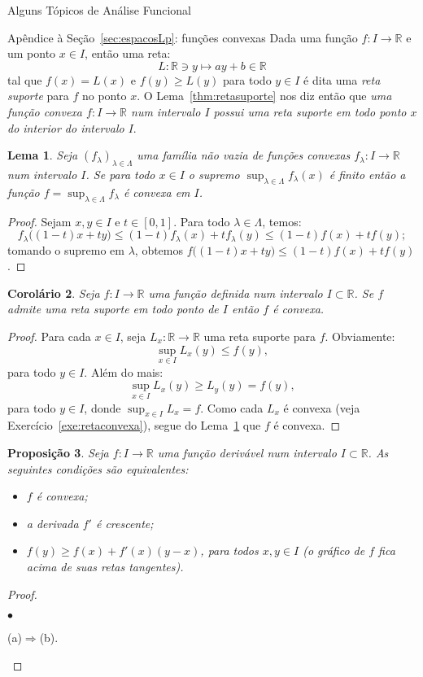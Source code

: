 \documentclass[oneside,final,11pt]{amsbook}
\newcommand{\R}{\mathds R}
\newcounter{contador}
\newenvironment{bulletindent}{\setcounter{contador}{0}
\begin{list} {$\bullet$}
{\usecounter{contador}
\setlength{\leftmargin}{10pt}
\setlength{\rightmargin}{10pt}
\setlength{\labelsep}{5pt}
\setlength{\itemsep}{10pt}
\setlength{\topsep}{10pt}}}
{\end{list}}
\theoremstyle{remark}\newtheorem{exercise}{Exercício}[chapter]
\theoremstyle{remark}\newtheorem{*exercise}[exercise]{\hbox to 0pt{\hskip 0pt minus 1fil*}Exercício}
\theoremstyle{definition}\newtheorem{exdefin}{Definição}[chapter]
\theoremstyle{plain}\newtheorem{teo}{Teorema}[section]
\theoremstyle{plain}\newtheorem{lem}[teo]{Lema}
\theoremstyle{plain}\newtheorem{prop}[teo]{Proposição}
\theoremstyle{plain}\newtheorem{cor}[teo]{Corolário}
\theoremstyle{definition}\newtheorem{defin}[teo]{Definição}
\theoremstyle{remark}\newtheorem{rem}[teo]{Observação}
\theoremstyle{definition}\newtheorem{notation}[teo]{Notação}
\theoremstyle{definition}\newtheorem{convention}[teo]{Convenção}
\theoremstyle{definition}\newtheorem{example}[teo]{Exemplo}
\numberwithin{section}{chapter}
\numberwithin{equation}{section}
\begin{document}
\begin{chapter}{Alguns Tópicos de Análise Funcional}
\begin{section}{Apêndice à Seção~\ref{sec:espacosLp}: funções convexas}
Dada uma função $f:I\to\R$ e um ponto $x\in I$, então uma reta:
\[L:\R\ni y\longmapsto ay+b\in\R\]
tal que $f(x)=L(x)$ e $f(y)\ge L(y)$ para todo $y\in I$ é dita uma {\em reta suporte\/} para
$f$ no ponto $x$. O Lema~\ref{thm:retasuporte} nos
diz então que {\em uma função convexa $f:I\to\R$ num intervalo $I$ possui uma reta suporte em todo ponto $x$ do interior
do intervalo $I$}.

\begin{lem}\label{thm:supconvexas}
Seja $(f_\lambda)_{\lambda\in\Lambda}$ uma família não vazia de funções convexas $f_\lambda:I\to\R$ num intervalo $I$.
Se para todo $x\in I$ o supremo $\sup_{\lambda\in\Lambda}f_\lambda(x)$ é finito então a função
$f=\sup_{\lambda\in\Lambda}f_\lambda$ é convexa em $I$.
\end{lem}
\begin{proof}
Sejam $x,y\in I$ e $t\in[0,1]$. Para todo $\lambda\in\Lambda$, temos:
\[f_\lambda\big((1-t)x+ty\big)\le(1-t)f_\lambda(x)+tf_\lambda(y)\le(1-t)f(x)+tf(y);\]
tomando o supremo em $\lambda$, obtemos $f\big((1-t)x+ty\big)\le(1-t)f(x)+tf(y)$.
\end{proof}

\begin{cor}\label{thm:retasupconv}
Seja $f:I\to\R$ uma função definida num intervalo $I\subset\R$. Se $f$ admite uma
reta suporte em todo ponto de $I$ então $f$ é convexa.
\end{cor}
\begin{proof}
Para cada $x\in I$, seja $L_x:\R\to\R$ uma reta suporte para $f$. Obviamente:
\[\sup_{x\in I}L_x(y)\le f(y),\]
para todo $y\in I$. Além do mais:
\[\sup_{x\in I}L_x(y)\ge L_y(y)=f(y),\]
para todo $y\in I$, donde $\sup_{x\in I}L_x=f$. Como cada $L_x$ é convexa
(veja Exercício~\ref{exe:retaconvexa}), segue do Lema~\ref{thm:supconvexas} que $f$ é convexa.
\end{proof}

\begin{prop}\label{thm:convexderivavel}
Seja $f:I\to\R$ uma função derivável num intervalo $I\subset\R$. As seguintes condições
são equivalentes:
\begin{itemize}
\item[(a)] $f$ é convexa;
\item[(b)] a derivada $f'$ é crescente;
\item[(c)] $f(y)\ge f(x)+f'(x)(y-x)$, para todos $x,y\in I$ (o gráfico de $f$ fica acima
de suas retas tangentes).
\end{itemize}
\end{prop}
\begin{proof}\
\begin{bulletindent}
\item (a)$\Rightarrow$(b).


\end{bulletindent}
\end{proof}
\end{section}
\end{chapter}
\end{document}
